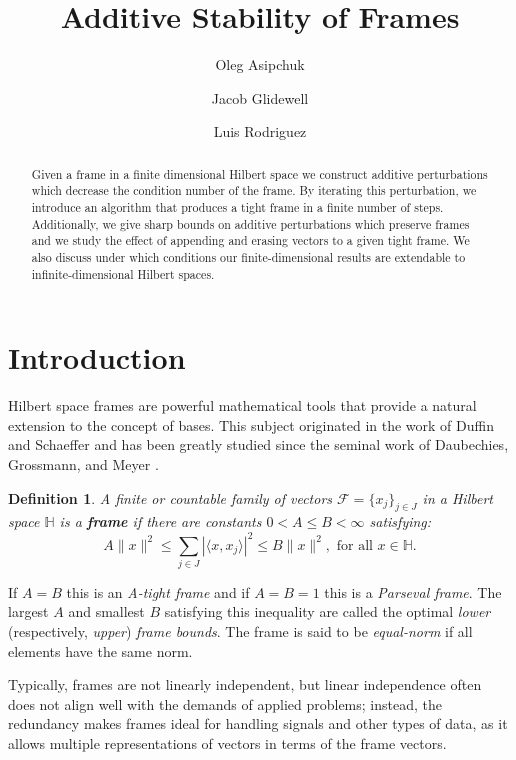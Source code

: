 \documentclass[11pt, reqno]{amsart}
\title{Additive Stability of Frames}
\author{Oleg Asipchuk}
\author{Jacob Glidewell}
\author{Luis Rodriguez}
\newtheorem{definition}[theorem]{Definition}
\numberwithin{equation}{section}
\begin{document}
	
\begin{abstract}
	Given a frame in a finite dimensional Hilbert space we construct additive perturbations which decrease the condition number of the frame.  By iterating  this perturbation, we introduce an algorithm that produces a tight frame in a finite number of steps. Additionally, we give sharp bounds on additive perturbations which preserve frames and we study the effect of appending and erasing vectors to a given tight frame. We also discuss under which conditions our finite-dimensional results are extendable to infinite-dimensional Hilbert spaces.
\end{abstract}	
	

\maketitle

\section{Introduction}

 
Hilbert space frames are powerful mathematical tools that provide a natural extension to the concept of bases. This subject
originated in the work of Duffin and 
Schaeffer \cite{Duffin} and has been greatly studied since the seminal work of  Daubechies, Grossmann, and Meyer \cite{DGM1986}.

\begin{definition}
	A finite or countable family of vectors ${\mathcal F} =\{x_j\}_{j\in J}$ in a Hilbert space $\mathbb{H} $ is a {\bf frame} if there are constants $0<A\le B<\infty$ satisfying:
	\[ A\|x\|^2 \le \sum_{j \in J}|\langle x,x_j\rangle|^2 \le B\|x\|^2,\mbox{ for all }x\in \mathbb{H} .\]
\end{definition}
 

If $A=B$ this is an {\it A-tight frame} and if $A=B=1$ this is a {\it Parseval frame}.  The largest $A$ and smallest $B$ satisfying
this inequality are called the optimal  {\it lower} (respectively, {\it upper}) {\it frame bounds}.
  The frame is said to be {\it equal-norm} if all elements have the same norm. 

\medskip
Typically, frames are not linearly independent, but linear independence often does not align well with the demands of applied problems; instead, the redundancy makes frames ideal for handling signals and other types of data, as it allows multiple representations of vectors in terms of the frame vectors. 
 
\end{document}
